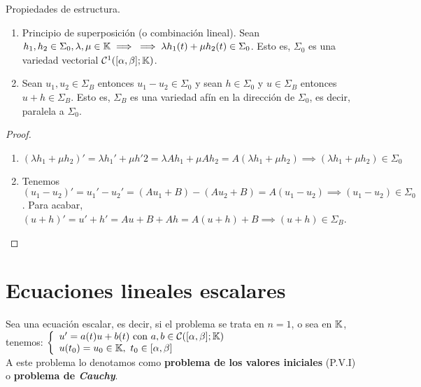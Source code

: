\begin{proposicion} Propiedades de estructura.
\begin{enumerate}[1)]
\item Principio de superposición (o combinación lineal). Sean $h_1,h_2\in \Sigma_0, \lambda, \mu\in\mathbb{K}\implies\\\implies \lambda h_1(t)+\mu h_2(t)\in\Sigma_0$. Esto es, $\Sigma_0$ es una variedad vectorial $\mathcal{C}^1([\alpha,\beta];\mathbb{K})$.
\item Sean $u_1,u_2\in\Sigma_B$ entonces $u_1-u_2\in\Sigma_0$ y sean $h\in\Sigma_0$ y $u\in\Sigma_B$ entonces $u+h\in\Sigma_B$. Esto es, $\Sigma_B$ es una variedad afín en la dirección de $\Sigma_0$, es decir, paralela a $\Sigma_0$.
\end{enumerate}
\begin{proof}\ 
\begin{enumerate}[1)]
\item $(\lambda h_1+\mu h_2)'=\lambda h_1'+\mu h'2=\lambda Ah_1 + \mu Ah_2=A(\lambda h_1+\mu h_2)\implies(\lambda h_1+\mu h_2)\in\Sigma_0$
\item Tenemos $(u_1-u_2)'=u_1'-u_2'=(Au_1+B)-(Au_2+B)=A(u_1-u_2)\implies (u_1-u_2)\in\Sigma_0$.
Para acabar, $(u+h)'=u'+h'=Au+B+Ah=A(u+h)+B\implies (u+h)\in\Sigma_B$.
\end{enumerate}
\end{proof}
\end{proposicion}

\section{Ecuaciones lineales escalares}
\begin{defi} Sea una ecuación escalar, es decir, si el problema se trata en $n=1$, o sea en $\mathbb{K}$, tenemos: 
$\doubleleft{u'=a(t)u+b(t)\ \mathrm{con\ }a,b\in\Cgot([\alpha,\beta];\K)}{u(t_0)=u_0\in\K,\ t_0\in[\alpha,\beta]}$\\
A este problema lo denotamos como \textbf{problema de los valores iniciales} (P.V.I) o \textbf{problema de \textit{Cauchy}}.
\end{defi}


